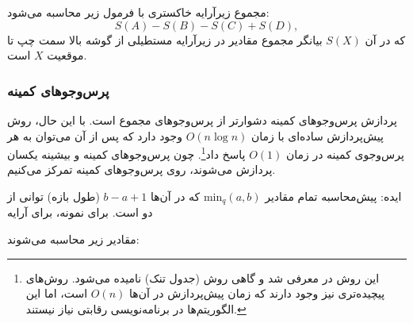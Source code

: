 مجموع زیرآرایه خاکستری با فرمول زیر محاسبه می‌شود:
\[S(A) - S(B) - S(C) + S(D),\]
که در آن $S(X)$ بیانگر مجموع مقادیر در زیرآرایه مستطیلی از گوشه بالا سمت چپ تا موقعیت $X$ است.

\subsubsection{پرس‌وجوهای کمینه}


پردازش پرس‌وجوهای کمینه دشوارتر از پرس‌وجوهای مجموع است.
با این حال، روش پیش‌پردازش ساده‌ای با زمان $O(n \log n)$ وجود دارد که پس از آن می‌توان به هر پرس‌وجوی کمینه در زمان $O(1)$ پاسخ داد\footnote{این روش در \cite{ben00} معرفی شد و گاهی روش  (جدول تنک) نامیده می‌شود.
روش‌های پیچیده‌تری نیز وجود دارند \cite{fis06} که زمان پیش‌پردازش در آن‌ها $O(n)$ است، اما این الگوریتم‌ها در برنامه‌نویسی رقابتی نیاز نیستند.}.
چون پرس‌وجوهای کمینه و بیشینه یکسان پردازش می‌شوند، روی پرس‌وجوهای کمینه تمرکز می‌کنیم.

ایده: پیش‌محاسبه تمام مقادیر $\textrm{min}_q(a,b)$ که در آن‌ها $b-a+1$ (طول بازه) توانی از دو است.
برای نمونه، برای آرایه

\begin{center}
\end{center}
مقادیر زیر محاسبه می‌شوند:

